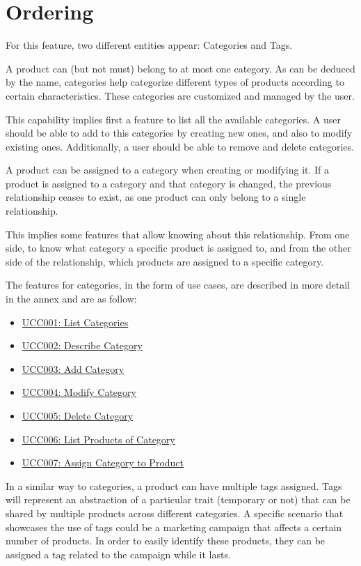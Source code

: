 \section{Ordering}
For this feature, two different entities appear: Categories and Tags. 

A product can (but not must) belong to at most one category. As can be deduced by the name, categories help categorize different types of products according to certain characteristics. These categories are customized and managed by the user.

This capability implies first a feature to list all the available categories. A user should be able to add to this categories by creating new ones, and also to modify existing ones. Additionally, a user should be able to remove and delete categories.

A product can be assigned to a category when creating or modifying it. If a product is assigned to a category and that category is changed, the previous relationship ceases to exist, as one product can only belong to a single relationship. 

This implies some features that allow knowing about this relationship. From one side, to know what category a specific product is assigned to, and from the other side of the relationship, which products are assigned to a specific category.

The features for categories, in the form of use cases, are described in more detail in the annex and are as follow:
\hfill\break
\begin{itemize}
\item \hyperref[UCC001]{UCC001: List Categories}
\item \hyperref[UCC002]{UCC002: Describe Category}
\item \hyperref[UCC003]{UCC003: Add Category}
\item \hyperref[UCC004]{UCC004: Modify Category}
\item \hyperref[UCC005]{UCC005: Delete Category}
\item \hyperref[UCC006]{UCC006: List Products of Category}
\item \hyperref[UCC007]{UCC007: Assign Category to Product}
\end{itemize}
\hfill\break
In a similar way to categories, a product can have multiple tags assigned. Tags will represent an abstraction of a particular trait (temporary or not) that can be shared by multiple products across different categories. A specific scenario that showcases the use of tags could be a marketing campaign that affects a certain number of products. In order to easily identify these products, they can be assigned a tag related to the campaign while it lasts.

